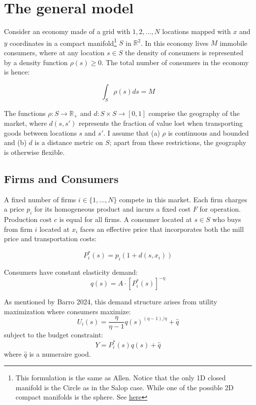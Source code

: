 \section{The general model}

Consider an economy made of a grid with $1,2,...,N$ locations mapped with $x$ and $y$ coordinates in a compact manifold\footnote{This formulation is the same as Allen. Notice that the only 1D closed manifold is the Circle as in the Salop case. While one of the possible 2D compact manifolds is the sphere. See \href{https://en.wikipedia.org/wiki/Closed_manifold}{here}} $S$ in $\mathbb{R}^2$. In this economy lives $M$ immobile consumers, where at any location $s \in S$ the density of consumers is represented by a density function $\rho(s) \geq 0$. The total number of consumers in the economy is hence:

\begin{equation}
\int_S \rho(s)ds = M
\end{equation}

The functions $\rho: S \rightarrow \mathbb{R}_+$ and $d: S \times S \rightarrow [0,1]$ comprise the geography of the market, where $d(s,s')$ represents the fraction of value lost when transporting goods between locations $s$ and $s'$. I assume that (a) $\rho$ is continuous and bounded and (b) $d$ is a distance metric on $S$; apart from these restrictions, the geography is otherwise flexible.

\subsection{Firms and Consumers}

A fixed number of firms $i \in \{1,...,N\}$ compete in this market. Each firm charges a price $p_i$ for its homogeneous product and incurs a fixed cost $F$ for operation. Production cost $c$ is equal for all firms. A consumer located at $s \in S$ who buys from firm $i$ located at $x_i$ faces an effective price that incorporates both the mill price and transportation costs:

\begin{equation}
P^*_i(s) = p_i(1 + d(s,x_i))
\end{equation}

Consumers have constant elasticity demand:
\begin{equation}
q(s) = A \cdot [P^*_i(s)]^{-\eta}
\end{equation}

As mentioned by Barro 2024, this demand structure arises from utility maximization where consumers maximize:
\begin{equation}
U_i(s) = \frac{\eta}{\eta-1}q(s)^{(\eta-1)/\eta} + \hat{q}
\end{equation}
subject to the budget constraint:
\begin{equation}
Y = P^*_i(s)q(s) + \hat{q}
\end{equation}
where $\hat{q}$ is a numeraire good.
